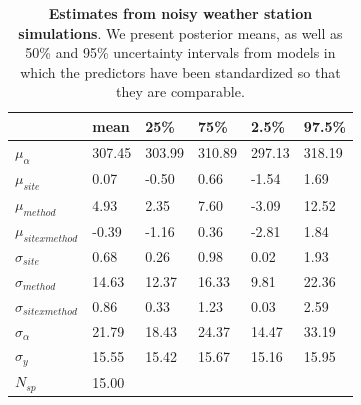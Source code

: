 \documentclass{article}\usepackage[]{graphicx}\usepackage[]{color}
\begin{document}
\begin{table}[ht]
\centering
\caption{\textbf{Estimates from noisy weather station simulations}. We present posterior means, as well as 50\% and 95\% uncertainty intervals from models in which the predictors have been standardized so that they are comparable.} 
\label{tab:noisyws}
\begingroup\footnotesize
\begin{tabular}{|p{}|p{}p{}p{}p{}p{}|}
  \hline
 & mean & 25\% & 75\% & 2.5\% & 97.5\% \\ 
  \hline
$\mu_{\alpha}$ & 307.45 & 303.99 & 310.89 & 297.13 & 318.19 \\ 
  $\mu_{site}$ & 0.07 & -0.50 & 0.66 & -1.54 & 1.69 \\ 
  $\mu_{method}$ & 4.93 & 2.35 & 7.60 & -3.09 & 12.52 \\ 
  $\mu_{sitexmethod}$ & -0.39 & -1.16 & 0.36 & -2.81 & 1.84 \\ 
  $\sigma_{site}$ & 0.68 & 0.26 & 0.98 & 0.02 & 1.93 \\ 
  $\sigma_{method}$ & 14.63 & 12.37 & 16.33 & 9.81 & 22.36 \\ 
  $\sigma_{sitexmethod}$ & 0.86 & 0.33 & 1.23 & 0.03 & 2.59 \\ 
  $\sigma_{\alpha}$ & 21.79 & 18.43 & 24.37 & 14.47 & 33.19 \\ 
  $\sigma_{y}$ & 15.55 & 15.42 & 15.67 & 15.16 & 15.95 \\ 
   \hline
$N_{sp}$ & 15.00 &  &  &  &  \\ 
   \hline
\end{tabular}
\endgroup
\end{table}
\end{document}
